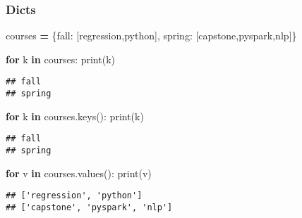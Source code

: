 \documentclass[
]{book}
\newenvironment{Shaded}{\begin{snugshade}}{\end{snugshade}}
\newcommand{\BuiltInTok}[1]{#1}
\newcommand{\ControlFlowTok}[1]{\textcolor[rgb]{0.13,0.29,0.53}{\textbf{#1}}}
\newcommand{\KeywordTok}[1]{\textcolor[rgb]{0.13,0.29,0.53}{\textbf{#1}}}
\newcommand{\NormalTok}[1]{#1}
\newcommand{\OperatorTok}[1]{\textcolor[rgb]{0.81,0.36,0.00}{\textbf{#1}}}
\newcommand{\StringTok}[1]{\textcolor[rgb]{0.31,0.60,0.02}{#1}}
\begin{document}
\subsubsection{Dicts}\label{dicts}

\begin{Shaded}
\begin{Highlighting}[]
\NormalTok{courses }\OperatorTok{=}\NormalTok{ \{}\StringTok{\textquotesingle{}fall\textquotesingle{}}\NormalTok{: [}\StringTok{\textquotesingle{}regression\textquotesingle{}}\NormalTok{,}\StringTok{\textquotesingle{}python\textquotesingle{}}\NormalTok{],}
         \StringTok{\textquotesingle{}spring\textquotesingle{}}\NormalTok{: [}\StringTok{\textquotesingle{}capstone\textquotesingle{}}\NormalTok{,}\StringTok{\textquotesingle{}pyspark\textquotesingle{}}\NormalTok{,}\StringTok{\textquotesingle{}nlp\textquotesingle{}}\NormalTok{]\}}
\end{Highlighting}
\end{Shaded}

\begin{Shaded}
\begin{Highlighting}[]
\ControlFlowTok{for}\NormalTok{ k }\KeywordTok{in}\NormalTok{ courses:}
  \BuiltInTok{print}\NormalTok{(k)}
\end{Highlighting}
\end{Shaded}

\begin{verbatim}
## fall
## spring
\end{verbatim}

\begin{Shaded}
\begin{Highlighting}[]
\ControlFlowTok{for}\NormalTok{ k }\KeywordTok{in}\NormalTok{ courses.keys():}
  \BuiltInTok{print}\NormalTok{(k)}
\end{Highlighting}
\end{Shaded}

\begin{verbatim}
## fall
## spring
\end{verbatim}

\begin{Shaded}
\begin{Highlighting}[]
\ControlFlowTok{for}\NormalTok{ v }\KeywordTok{in}\NormalTok{ courses.values():}
  \BuiltInTok{print}\NormalTok{(v)}
\end{Highlighting}
\end{Shaded}

\begin{verbatim}
## ['regression', 'python']
## ['capstone', 'pyspark', 'nlp']
\end{verbatim}
\end{document}
